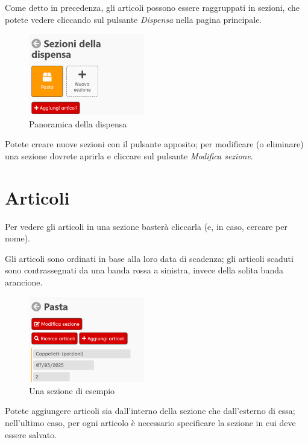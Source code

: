 \documentclass[12pt, a4paper]{report}
\begin{document}
    Come detto in precedenza, gli articoli possono essere raggruppati in sezioni, che potete vedere cliccando sul pulsante \emph{Dispensa} nella
    pagina principale.

    \begin{figure}[H]
        \centering
        \includegraphics[width=0.45\textwidth]{assets/it/sections.png}
        \caption{Panoramica della dispensa}
    \end{figure}

    Potete creare nuove sezioni con il pulsante apposito; per modificare (o eliminare) una sezione dovrete aprirla e cliccare sul pulsante
    \emph{Modifica sezione}.

    \section{Articoli}

    Per vedere gli articoli in una sezione basterà cliccarla (e, in caso, cercare per nome).

    Gli articoli sono ordinati in base alla loro data di scadenza; gli articoli scaduti sono contrassegnati da una banda rossa a sinistra, invece
    della solita banda arancione.

    \begin{figure}[H]
        \centering
        \includegraphics[width=0.45\textwidth]{assets/it/articles.png}
        \caption{Una sezione di esempio}
    \end{figure}

    Potete aggiungere articoli sia dall'interno della sezione che dall'esterno di essa; nell'ultimo caso, per ogni articolo è necessario specificare
    la sezione in cui deve essere salvato.
\end{document}
